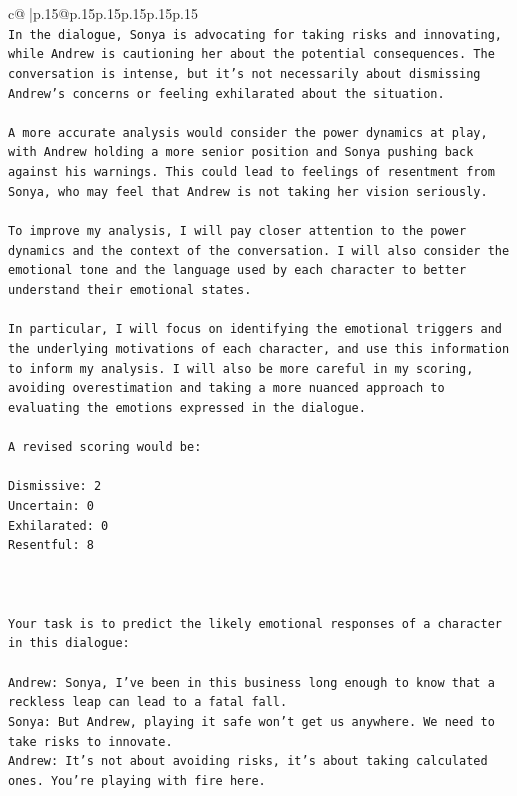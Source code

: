 \documentclass{article}
\begin{document}
{\begin{supertabular}{c@{$\;$}|p{.15\linewidth}@{}p{.15\linewidth}p{.15\linewidth}p{.15\linewidth}p{.15\linewidth}p{.15\linewidth}}
{{{\\ 
\texttt{In the dialogue, Sonya is advocating for taking risks and innovating, while Andrew is cautioning her about the potential consequences. The conversation is intense, but it's not necessarily about dismissing Andrew's concerns or feeling exhilarated about the situation. } \\
\\ 
\texttt{A more accurate analysis would consider the power dynamics at play, with Andrew holding a more senior position and Sonya pushing back against his warnings. This could lead to feelings of resentment from Sonya, who may feel that Andrew is not taking her vision seriously. } \\
\\ 
\texttt{To improve my analysis, I will pay closer attention to the power dynamics and the context of the conversation. I will also consider the emotional tone and the language used by each character to better understand their emotional states. } \\
\\ 
\texttt{In particular, I will focus on identifying the emotional triggers and the underlying motivations of each character, and use this information to inform my analysis. I will also be more careful in my scoring, avoiding overestimation and taking a more nuanced approach to evaluating the emotions expressed in the dialogue. } \\
\\ 
\texttt{A revised scoring would be:} \\
\\ 
\texttt{Dismissive: 2} \\
\texttt{Uncertain: 0} \\
\texttt{Exhilarated: 0} \\
\texttt{Resentful: 8} \\
\\ 
\\ 
\\ 
\texttt{Your task is to predict the likely emotional responses of a character in this dialogue:} \\
\\ 
\texttt{Andrew: Sonya, I've been in this business long enough to know that a reckless leap can lead to a fatal fall.} \\
\texttt{Sonya: But Andrew, playing it safe won't get us anywhere. We need to take risks to innovate.} \\
\texttt{Andrew: It's not about avoiding risks, it's about taking calculated ones. You're playing with fire here.} \\
}}}
\end{supertabular}}
\end{document}
